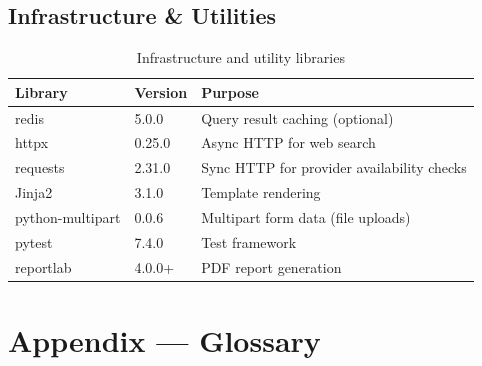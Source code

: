 \documentclass[12pt, a4paper, oneside]{report}
\begin{document}
\section{Infrastructure \& Utilities}

\begin{table}[H]
\centering
{}
\begin{tabularx}{\linewidth}{llX}
\toprule
\rowcolor{rapidblue!10}
\textbf{Library} & \textbf{Version} & \textbf{Purpose} \\
\midrule
redis & 5.0.0 & Query result caching (optional) \\
httpx & 0.25.0 & Async HTTP for web search \\
requests & 2.31.0 & Sync HTTP for provider availability checks \\
Jinja2 & 3.1.0 & Template rendering \\
python-multipart & 0.0.6 & Multipart form data (file uploads) \\
pytest & 7.4.0 & Test framework \\
reportlab & 4.0.0+ & PDF report generation \\
\bottomrule
\end{tabularx}
\caption{Infrastructure and utility libraries}
\end{table}

\chapter{Appendix — Glossary}
\end{document}

